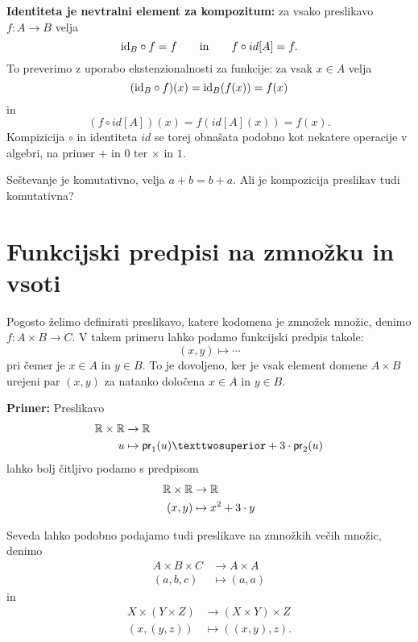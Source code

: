 \textbf{Identiteta je nevtralni element za kompozitum:} za vsako preslikavo $f : A \to B$ velja
%
\begin{equation*}
  \id[B] \circ f = f
  \iinn
  f \circ id[A] = f.
\end{equation*}
%
To preverimo z uporabo ekstenzionalnosti za funkcije: za vsak $x \in A$ velja
%
\begin{equation*}
    (\id[B] \circ f)(x) = \id[B] (f(x)) = f(x)
\end{equation*}
%
in
\begin{equation*}
  (f \circ id[A])(x) = f (id[A](x)) = f(x).
\end{equation*}
%
Kompizicija $\circ$ in identiteta $id$ se torej obnašata podobno kot nekatere operacije v algebri, na primer $+$ in $0$ ter $×$ in $1$.

\begin{naloga}
  Seštevanje je komutativno, velja $a + b = b + a$. Ali je kompozicija preslikav tudi komutativna?
\end{naloga}

\section{Funkcijski predpisi na zmnožku in vsoti}

Pogosto želimo definirati preslikavo, katere kodomena je zmnožek množic, denimo $f : A \times B \to C$. V takem primeru lahko
podamo funkcijski predpis takole:
%
\begin{equation*}
  (x, y) \mapsto \cdots
\end{equation*}
%
pri čemer je $x \in A$ in $y \in B$. To je dovoljeno, ker je vsak element domene $A \times B$ urejeni par $(x, y)$ za natanko določena $x \in A$ in $y \in B$.

\begin{primer}

\textbf{Primer:} Preslikavo
%
\begin{align*}
  \RR \times \RR  &\to  \RR \\
  u &\mapsto  \fst{u}² + 3 \cdot \snd{u}
\end{align*}
%
lahko bolj čitljivo podamo s predpisom
%
\begin{align*}
  \RR \times \RR  &\to  \RR \\
  (x, y) &\mapsto  x^2 + 3 \cdot y
\end{align*}
\end{primer}

\begin{primer}
  Seveda lahko podobno podajamo tudi preslikave na zmnožkih večih množic, denimo
  \begin{align*}
  A \times B \times C &\to A \times A \\
  (a, b, c) &\mapsto (a, a)
  \end{align*}
  in
  \begin{align*}
  X \times (Y \times Z) &\to (X \times Y) \times Z \\
  (x, (y, z)) &\mapsto ((x, y), z).
  \end{align*}
\end{primer}

